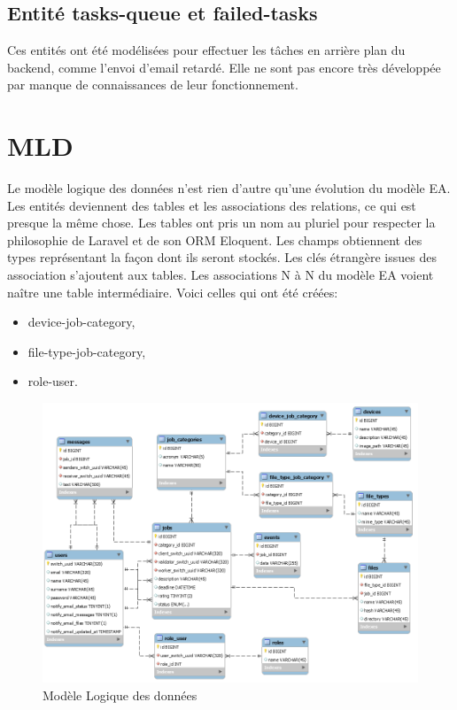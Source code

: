\documentclass[
    iai, %
    il, %
]{heig-tb}
\begin{document}
\subsection{Entité tasks-queue et failed-tasks}
Ces entités ont été modélisées pour effectuer les tâches en arrière plan du backend, comme l'envoi d'email retardé. Elle ne sont pas encore très développée par manque de connaissances de leur fonctionnement.

\section{MLD}
Le modèle logique des données n'est rien d'autre qu'une évolution du modèle EA.\newline
Les entités deviennent des tables et les associations des relations, ce qui est presque la même chose.\newline
Les tables ont pris un nom au pluriel pour respecter la philosophie de Laravel et de son ORM Eloquent.\newline
Les champs obtiennent des types représentant la façon dont ils seront stockés.\newline
Les clés étrangère issues des association s'ajoutent aux tables.\newline
Les associations N à N du modèle EA voient naître une table intermédiaire. Voici celles qui ont été créées:
\begin{itemize}
    \item device-job-category,
    \item file-type-job-category,
    \item role-user.
\end{itemize}

\begin{center}
    \begin{figure}
        \includegraphics[width=\textwidth]{./assets/figures/mld.png}
        \caption{Modèle Logique des données \label{mld}}
    \end{figure}
\end{center}
\end{document}
